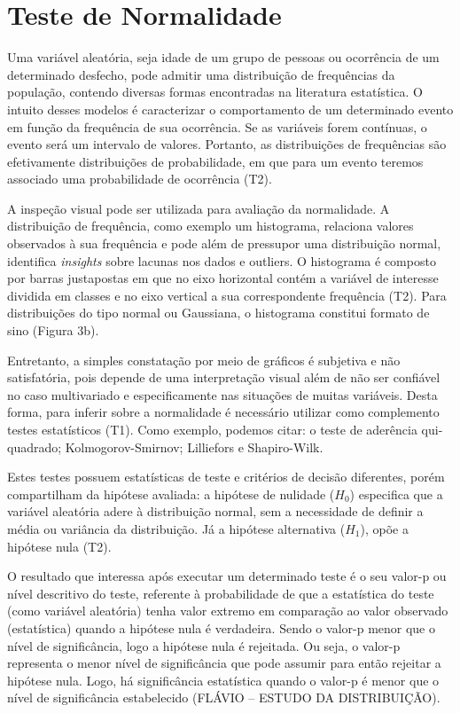 \section{Teste de Normalidade}
Uma variável aleatória, seja idade de um grupo de pessoas ou ocorrência de um determinado desfecho, pode admitir uma distribuição de frequências da população, contendo diversas formas encontradas na literatura estatística. O intuito desses modelos é caracterizar o comportamento de um determinado evento em função da frequência de sua ocorrência. Se as variáveis forem contínuas, o evento será um intervalo de valores. Portanto, as distribuições de frequências são efetivamente distribuições de probabilidade, em que para um evento teremos associado uma probabilidade de ocorrência (T2). 

A inspeção visual pode ser utilizada para avaliação da normalidade. A distribuição de frequência, como exemplo um histograma, relaciona valores observados à sua frequência e pode além de pressupor uma distribuição normal, identifica \textit{insights} sobre lacunas nos dados e outliers. O histograma é composto por barras justapostas em que no eixo horizontal contém a variável de interesse dividida em classes e no eixo vertical a sua correspondente frequência (T2). Para distribuições do tipo normal ou Gaussiana, o histograma constitui formato de sino (Figura 3b).

Entretanto, a simples constatação por meio de gráficos é subjetiva e não satisfatória, pois depende de uma interpretação visual além de não ser confiável no caso multivariado e especificamente nas situações de muitas variáveis. Desta forma, para inferir sobre a normalidade é necessário utilizar como complemento testes estatísticos (T1).  Como exemplo, podemos citar: o teste de aderência qui-quadrado; Kolmogorov-Smirnov; Lilliefors e Shapiro-Wilk. 

Estes testes possuem estatísticas de teste e critérios de decisão diferentes, porém compartilham da hipótese avaliada: a hipótese de nulidade ($H_0$) especifica que a variável aleatória adere à distribuição normal, sem a necessidade de definir a média ou variância da distribuição. Já a hipótese alternativa ($H_1$), opõe a hipótese nula (T2). 

O resultado que interessa após executar um determinado teste é o seu valor-p ou nível descritivo do teste, referente à probabilidade de que a estatística do teste (como variável aleatória) tenha valor extremo em comparação ao valor observado (estatística) quando a hipótese nula é verdadeira. Sendo o valor-p menor que o nível de significância, logo a hipótese nula é rejeitada. Ou seja, o valor-p representa o menor nível de significância que pode assumir para então rejeitar a hipótese nula. Logo, há significância estatística quando o valor-p é menor que o nível de significância estabelecido (FLÁVIO – ESTUDO DA DISTRIBUIÇÃO).  

